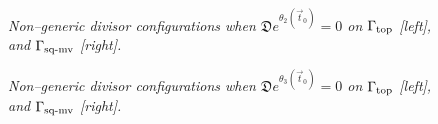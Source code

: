 \documentclass[11pt]{amsart}
\theoremstyle{plain}
\numberwithin{equation}{section}
\begin{document}
\begin{figure}
\caption{\small{\sl Non--generic divisor configurations when ${\mathfrak D} e^{\theta_2(\vec t_0)} =0$ on ${\Gamma}_{\mbox{\scriptsize top}}$ [left], and ${\Gamma}_{\mbox{\scriptsize sq-mv}}$ [right].}}
\label{fig:Gr24_top_D2_null}
\end{figure}

\begin{figure}
\caption{\small{\sl Non--generic divisor configurations when ${\mathfrak D} e^{\theta_3(\vec t_0)} =0$ on ${\Gamma}_{\mbox{\scriptsize top}}$ [left], and ${\Gamma}_{\mbox{\scriptsize sq-mv}}$ [right].}}
\label{fig:Gr24_top_D3_null}
\end{figure}
\end{document}
